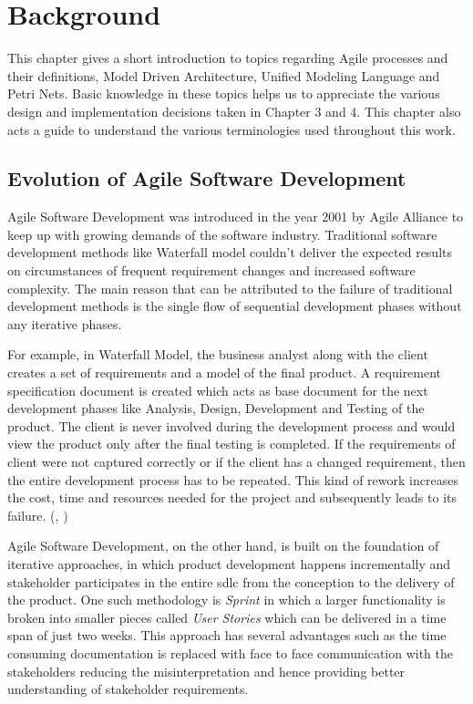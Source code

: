 \chapter{Background}
This chapter gives a short introduction to topics regarding Agile processes and their definitions, Model Driven Architecture, Unified Modeling Language and Petri Nets. Basic knowledge in these topics helps us to appreciate the various design and implementation decisions taken in Chapter 3 and 4. This chapter also acts a guide to understand the various terminologies used throughout this work.

\section{Evolution of Agile Software Development}
Agile Software Development was introduced in the year 2001 by Agile Alliance to keep up with growing demands of the software industry. Traditional software development methods like Waterfall model couldn’t deliver the expected results on circumstances of frequent requirement changes and increased software complexity. The main reason that can be attributed to the failure of traditional development methods is the single flow of sequential development phases without any iterative phases.

For example, in Waterfall Model, the business analyst along with the client creates a set of requirements and a model of the final product. A requirement specification document is created which acts as base document for the next development phases like Analysis, Design, Development and Testing of the product. The client is never involved during the development process and would view the product only after the final testing is completed. If the requirements of client were not captured correctly or if the client has a changed requirement, then the entire development process has to be repeated. This kind of rework increases the cost, time and resources needed for the project and subsequently leads to its failure. (\cite{versionone}, \cite{getzephyr})

Agile Software Development, on the other hand, is built on the foundation of iterative approaches, in which product development happens incrementally and stakeholder participates in the entire \gls{sdlc} from the conception to the delivery of the product. One such methodology is \textit{Sprint} in which a larger functionality is broken into smaller pieces called \textit{User Stories} which can be delivered in a time span of just two weeks. This approach has several advantages such as the time consuming documentation is replaced with face to face communication with the stakeholders reducing the misinterpretation and hence providing better understanding of stakeholder requirements.

